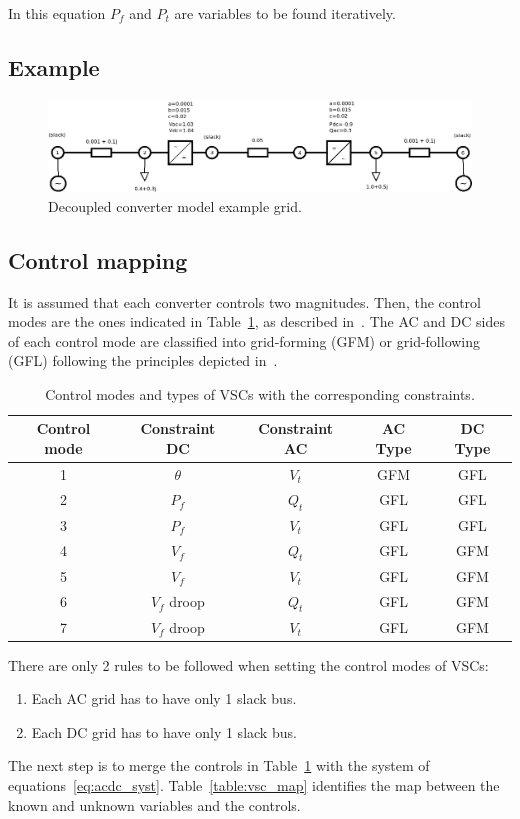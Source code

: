 \documentclass[11pt]{article}
\begin{document}
	In this equation $P_f$ and $P_t$ are variables to be found iteratively.
	
	
	\subsection{Example}
		
	
	
	\begin{figure}[h!]
		\centering
		\includegraphics[width=1.0\linewidth]{acdc_6bus_diagram}
		\caption{Decoupled converter model example grid.}
		\label{fig:acdc6busdiagram}
	\end{figure}

	\subsection{Control mapping}
	It is assumed that each converter controls two magnitudes. Then, the control modes are the ones indicated in Table~\ref{table:contr_vsc}, as described in~\cite{alvarez2021universal}. The AC and DC sides of each control mode are classified into grid-forming (GFM) or grid-following (GFL) following the principles depicted in~\cite{gomis2020principles}.

	\begin{table}[!htb]\centering
		\caption{Control modes and types of VSCs with the corresponding constraints.}
		\begin{tabular}{ccccc}
			\hline
			\textbf{Control mode} & \textbf{Constraint DC} & \textbf{Constraint AC} & \textbf{AC Type} & \textbf{DC Type} \\
			\hline
			\hline
			1 & $\theta$ & $V_t$ & GFM & GFL \\
			2 & $P_f$ & $Q_t$ & GFL & GFL \\
			3 & $P_f$ & $V_t$ & GFL & GFL \\
			4 & $V_f$ & $Q_t$ & GFL & GFM \\
			5 & $V_f$ & $V_t$ & GFL & GFM \\
			6 & $V_f$ droop & $Q_t$ & GFL & GFM \\
			7 & $V_f$ droop & $V_t$ & GFL & GFM \\
			\hline
		\end{tabular}
		\label{table:contr_vsc}
	\end{table}
There are only 2 rules to be followed when setting the control modes of VSCs:
\begin{enumerate}
	\item Each AC grid has to have only 1 slack bus.
	\item Each DC grid has to have only 1 slack bus.
\end{enumerate}
The next step is to merge the controls in Table~\ref{table:contr_vsc} with the system of equations~\eqref{eq:acdc_syst}. Table~\ref{table:vsc_map} identifies the map between the known and unknown variables and the controls.
\end{document}
